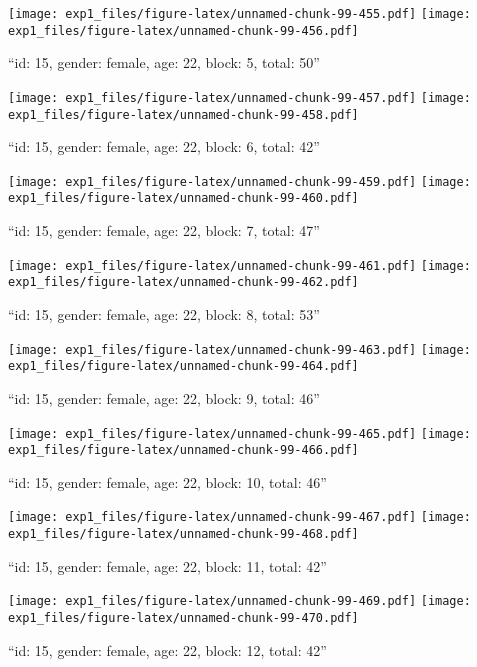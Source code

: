 \documentclass[,]{article}
\begin{document}
\texttt{[image: exp1\_files/figure-latex/unnamed-chunk-99-455.pdf]}
\texttt{[image: exp1\_files/figure-latex/unnamed-chunk-99-456.pdf]}

\newpage
[1] 

``id: 15, gender: female, age: 22, block: 5, total: 50''

\texttt{[image: exp1\_files/figure-latex/unnamed-chunk-99-457.pdf]}
\texttt{[image: exp1\_files/figure-latex/unnamed-chunk-99-458.pdf]}

\newpage
[1] 

``id: 15, gender: female, age: 22, block: 6, total: 42''

\texttt{[image: exp1\_files/figure-latex/unnamed-chunk-99-459.pdf]}
\texttt{[image: exp1\_files/figure-latex/unnamed-chunk-99-460.pdf]}

\newpage
[1] 

``id: 15, gender: female, age: 22, block: 7, total: 47''

\texttt{[image: exp1\_files/figure-latex/unnamed-chunk-99-461.pdf]}
\texttt{[image: exp1\_files/figure-latex/unnamed-chunk-99-462.pdf]}

\newpage
[1] 

``id: 15, gender: female, age: 22, block: 8, total: 53''

\texttt{[image: exp1\_files/figure-latex/unnamed-chunk-99-463.pdf]}
\texttt{[image: exp1\_files/figure-latex/unnamed-chunk-99-464.pdf]}

\newpage
[1] 

``id: 15, gender: female, age: 22, block: 9, total: 46''

\texttt{[image: exp1\_files/figure-latex/unnamed-chunk-99-465.pdf]}
\texttt{[image: exp1\_files/figure-latex/unnamed-chunk-99-466.pdf]}

\newpage
[1] 

``id: 15, gender: female, age: 22, block: 10, total: 46''

\texttt{[image: exp1\_files/figure-latex/unnamed-chunk-99-467.pdf]}
\texttt{[image: exp1\_files/figure-latex/unnamed-chunk-99-468.pdf]}

\newpage
[1] 

``id: 15, gender: female, age: 22, block: 11, total: 42''

\texttt{[image: exp1\_files/figure-latex/unnamed-chunk-99-469.pdf]}
\texttt{[image: exp1\_files/figure-latex/unnamed-chunk-99-470.pdf]}

\newpage
[1] 

``id: 15, gender: female, age: 22, block: 12, total: 42''
\end{document}
